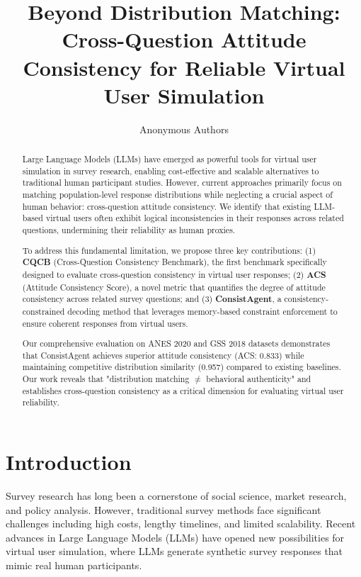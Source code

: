 \documentclass[sigconf, anonymous]{acmart}
\begin{document}
\title{Beyond Distribution Matching: Cross-Question Attitude Consistency for Reliable Virtual User Simulation}

\author{Anonymous Authors}

\begin{abstract}
Large Language Models (LLMs) have emerged as powerful tools for virtual user simulation in survey research, enabling cost-effective and scalable alternatives to traditional human participant studies. However, current approaches primarily focus on matching population-level response distributions while neglecting a crucial aspect of human behavior: cross-question attitude consistency. We identify that existing LLM-based virtual users often exhibit logical inconsistencies in their responses across related questions, undermining their reliability as human proxies.

To address this fundamental limitation, we propose three key contributions: (1) \textbf{CQCB} (Cross-Question Consistency Benchmark), the first benchmark specifically designed to evaluate cross-question consistency in virtual user responses; (2) \textbf{ACS} (Attitude Consistency Score), a novel metric that quantifies the degree of attitude consistency across related survey questions; and (3) \textbf{ConsistAgent}, a consistency-constrained decoding method that leverages memory-based constraint enforcement to ensure coherent responses from virtual users.

Our comprehensive evaluation on ANES 2020 and GSS 2018 datasets demonstrates that ConsistAgent achieves superior attitude consistency (ACS: 0.833) while maintaining competitive distribution similarity (0.957) compared to existing baselines. Our work reveals that "distribution matching $\neq$ behavioral authenticity" and establishes cross-question consistency as a critical dimension for evaluating virtual user reliability.
\end{abstract}


\maketitle

\section{Introduction}

Survey research has long been a cornerstone of social science, market research, and policy analysis. However, traditional survey methods face significant challenges including high costs, lengthy timelines, and limited scalability. Recent advances in Large Language Models (LLMs) have opened new possibilities for virtual user simulation, where LLMs generate synthetic survey responses that mimic real human participants.
\end{document}

